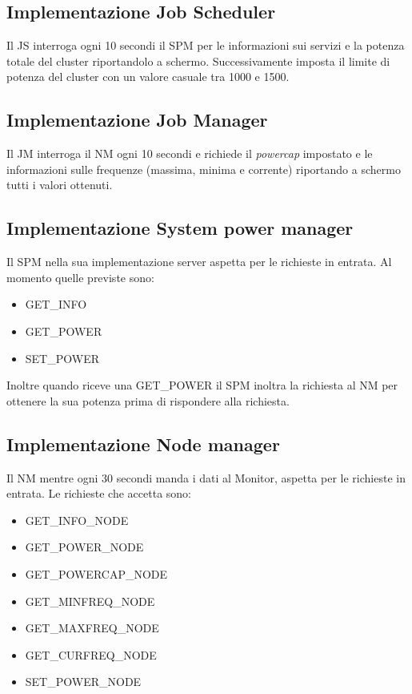 \subsection*{Implementazione Job Scheduler}
Il JS interroga ogni 10 secondi  il SPM per le informazioni sui servizi e la potenza totale del cluster riportandolo a schermo. Successivamente  imposta il limite di potenza del cluster con un valore casuale tra 1000 e 1500.

\subsection*{Implementazione Job Manager}
Il JM interroga il NM ogni 10 secondi e richiede il \emph{powercap} impostato e le informazioni sulle frequenze (massima, minima e corrente) riportando a schermo tutti i valori ottenuti.

\subsection*{Implementazione System power manager}
Il SPM nella sua implementazione server aspetta per le richieste in entrata. Al momento quelle previste sono:
\begin{itemize}
    \item GET\_INFO
    \item GET\_POWER
    \item SET\_POWER
\end{itemize}
Inoltre quando riceve una GET\_POWER il SPM inoltra la richiesta al NM per ottenere la sua potenza prima di rispondere alla richiesta. 

\subsection*{Implementazione Node manager}
Il NM mentre ogni 30 secondi manda i dati al Monitor, aspetta per le richieste in entrata. Le richieste che accetta sono:
\begin{itemize}
    \item GET\_INFO\_NODE
    \item GET\_POWER\_NODE
    \item GET\_POWERCAP\_NODE 
    \item GET\_MINFREQ\_NODE   
    \item GET\_MAXFREQ\_NODE     
    \item GET\_CURFREQ\_NODE   
    \item SET\_POWER\_NODE
\end{itemize}

